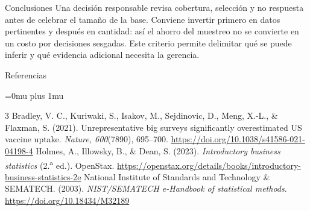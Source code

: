 \documentclass[spanish,final,xcolor={dvipsnames,table}]{beamer}
\begin{document}
\begin{itescaposter}
\begin{block}{Conclusiones}
Una decisión responsable revisa cobertura, selección y no respuesta antes de celebrar el tamaño de la base. Conviene invertir primero en datos pertinentes y después en cantidad: así el ahorro del muestreo no se convierte en un costo por decisiones sesgadas. Este criterio permite delimitar qué se puede inferir y qué evidencia adicional necesita la gerencia.
\end{block}

\begin{block}{Referencias}
\fontsize{9.5}{11.1}\selectfont{}\raggedright
{}\Urlmuskip=0mu plus 1mu
\setlength{\emergencystretch}{2em}
\renewcommand{\bibsection}{}\setlength{\bibsep}{2pt}\setlength{\bibhang}{0.65cm}
\begin{thebibliography}{3}
Bradley, V. C., Kuriwaki, S., Isakov, M., Sejdinovic, D., Meng, X.-L., \& Flaxman, S. (2021). Unrepresentative big surveys significantly overestimated US vaccine uptake. \textit{Nature, 600}(7890), 695--700. \url{https://doi.org/10.1038/s41586-021-04198-4}
Holmes, A., Illowsky, B., \& Dean, S. (2023). \textit{Introductory business statistics} (2.\textsuperscript{a} ed.). OpenStax. \url{https://openstax.org/details/books/introductory-business-statistics-2e}
National Institute of Standards and Technology \& SEMATECH. (2003). \textit{NIST/SEMATECH e-Handbook of statistical methods}. \url{https://doi.org/10.18434/M32189}
\end{thebibliography}
\end{block}
\end{itescaposter}
\end{document}
